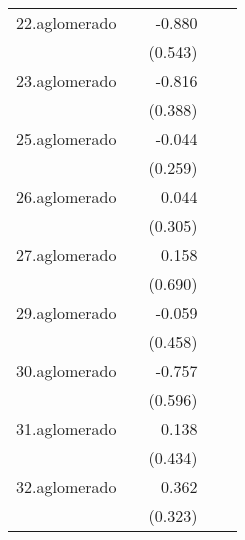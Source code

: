 {\begin{longtable}{l*{4}{D{.}{.}{-1}}}
\addlinespace
22.aglomerado&                     &      -0.880         &                     &                     \\
            &                     &     (0.543)         &                     &                     \\
\addlinespace
23.aglomerado&                     &      -0.816\sym{*}  &                     &                     \\
            &                     &     (0.388)         &                     &                     \\
\addlinespace
25.aglomerado&                     &      -0.044         &                     &                     \\
            &                     &     (0.259)         &                     &                     \\
\addlinespace
26.aglomerado&                     &       0.044         &                     &                     \\
            &                     &     (0.305)         &                     &                     \\
\addlinespace
27.aglomerado&                     &       0.158         &                     &                     \\
            &                     &     (0.690)         &                     &                     \\
\addlinespace
29.aglomerado&                     &      -0.059         &                     &                     \\
            &                     &     (0.458)         &                     &                     \\
\addlinespace
30.aglomerado&                     &      -0.757         &                     &                     \\
            &                     &     (0.596)         &                     &                     \\
\addlinespace
31.aglomerado&                     &       0.138         &                     &                     \\
            &                     &     (0.434)         &                     &                     \\
\addlinespace
32.aglomerado&                     &       0.362         &                     &                     \\
            &                     &     (0.323)         &                     &                     \\

\end{longtable}}
